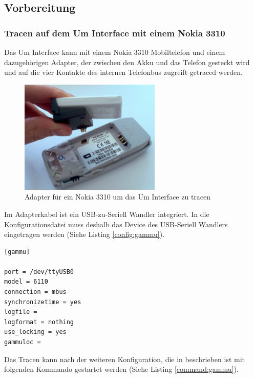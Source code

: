 \label{sec:analyse}

\subsection{Vorbereitung}
\subsubsection{Tracen auf dem Um Interface mit einem Nokia 3310}\label{sec:umtrace}
Das Um Interface kann mit einem Nokia 3310 Mobiltelefon und einem dazugehörigen Adapter, der zwischen den Akku und das Telefon gesteckt wird und auf die vier Kontakte des internen Telefonbus zugreift getraced werden.

\begin{figure}[htbp]
	\centering
		\includegraphics[width=0.6\textwidth]{img/nokia-trace}
	\caption{Adapter für ein Nokia 3310 um das Um Interface zu tracen}
	\label{fig:nokia-trace}
\end{figure}

Im Adapterkabel ist ein USB-zu-Seriell Wandler integriert. In die Konfigurationsdatei muss deshalb das Device des USB-Seriell Wandlers eingetragen werden (Siehe Listing \ref{config:gammu}).

\begin{lstlisting}[label=config:gammu,caption={Konfigurationsdatei für gammu und dem verwendeten Adapter}]
[gammu]

port = /dev/ttyUSB0
model = 6110
connection = mbus
synchronizetime = yes
logfile = 
logformat = nothing
use_locking = yes
gammuloc = 
\end{lstlisting}

Das Tracen kann nach der weiteren Konfiguration, die in \cite{bib:nokiagammu} beschrieben ist mit folgenden Kommando gestartet werden (Siehe Listing \ref{command:gammu}).

